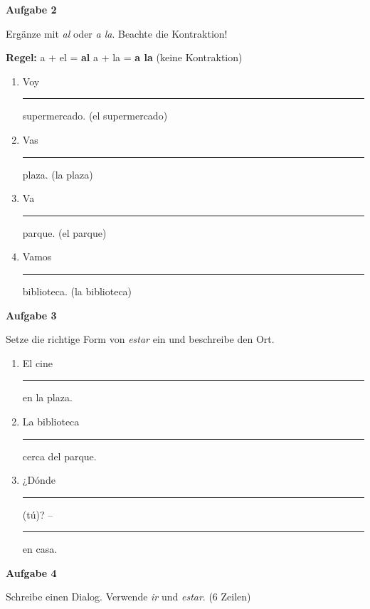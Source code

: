 \documentclass[11pt, a4paper]{article}
\newcommand{\fachfarbe}{spanisch}
\newcommand{\punktebox}[1]{\hfill\fbox{\small \_/#1}}
\newcommand{\luecke}[1]{\rule{#1}{0.4pt}}
\newenvironment{aufgabe}[1]{%
    \needspace{5\baselineskip}%
    \nopagebreak[4]%
    \vspace{10pt}
    \noindent\textbf{\textcolor{\fachfarbe}{Aufgabe #1}}
    \nopagebreak[4]%
    \vspace{5pt}
    \nopagebreak[4]%
    \begin{list}{}{\leftmargin=0pt}
    \item[]
}{%
    \end{list}
}
\begin{document}
\begin{aufgabe}{2}
Ergänze mit \textit{al} oder \textit{a la}. Beachte die Kontraktion! \punktebox{4}
\end{aufgabe}

\begin{hinweis}
\textbf{Regel:} a + el = \textbf{al} \hspace{1cm} a + la = \textbf{a la} (keine Kontraktion)
\end{hinweis}

\vspace{0.5em}

\begin{enumerate}[label=\alph*)]
    \item Voy \luecke{2cm} supermercado. (el supermercado)
    \item Vas \luecke{2cm} plaza. (la plaza)
    \item Va \luecke{2cm} parque. (el parque)
    \item Vamos \luecke{2cm} biblioteca. (la biblioteca)
\end{enumerate}

\vspace{15pt}


\begin{aufgabe}{3}
Setze die richtige Form von \textit{estar} ein und beschreibe den Ort. \punktebox{6}
\end{aufgabe}

\begin{enumerate}[label=\alph*)]
    \item El cine \luecke{2cm} en la plaza.
    \item La biblioteca \luecke{2cm} cerca del parque.
    \item ¿Dónde \luecke{2cm} (tú)? -- \luecke{2cm} en casa.
\end{enumerate}

\vspace{15pt}


\begin{aufgabe}{4}
Schreibe einen Dialog. Verwende \textit{ir} und \textit{estar}. (6 Zeilen) \punktebox{6}
\end{aufgabe}
\end{document}

